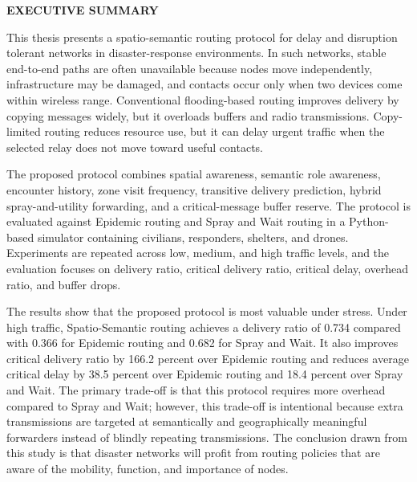 \begin{center}
	\Large{\textbf{EXECUTIVE SUMMARY}}	
\end{center}
\vspace{1em}
\normalsize
\hspace{1cm} This thesis presents a spatio-semantic routing protocol for delay and disruption tolerant networks in disaster-response environments. In such networks, stable end-to-end paths are often unavailable because nodes move independently, infrastructure may be damaged, and contacts occur only when two devices come within wireless range. Conventional flooding-based routing improves delivery by copying messages widely, but it overloads buffers and radio transmissions. Copy-limited routing reduces resource use, but it can delay urgent traffic when the selected relay does not move toward useful contacts.

The proposed protocol combines spatial awareness, semantic role awareness, encounter history, zone visit frequency, transitive delivery prediction, hybrid spray-and-utility forwarding, and a critical-message buffer reserve. The protocol is evaluated against Epidemic routing and Spray and Wait routing in a Python-based simulator containing civilians, responders, shelters, and drones. Experiments are repeated across low, medium, and high traffic levels, and the evaluation focuses on delivery ratio, critical delivery ratio, critical delay, overhead ratio, and buffer drops.

The results show that the proposed protocol is most valuable under stress. Under high traffic, Spatio-Semantic routing achieves a delivery ratio of 0.734 compared with 0.366 for Epidemic routing and 0.682 for Spray and Wait. It also improves critical delivery ratio by 166.2 percent over Epidemic routing and reduces average critical delay by 38.5 percent over Epidemic routing and 18.4 percent over Spray and Wait. The primary trade-off is that this protocol requires more overhead compared to Spray and Wait; however, this trade-off is intentional because extra transmissions are targeted at semantically and geographically meaningful forwarders instead of blindly repeating transmissions. The conclusion drawn from this study is that disaster networks will profit from routing policies that are aware of the mobility, function, and importance of nodes.